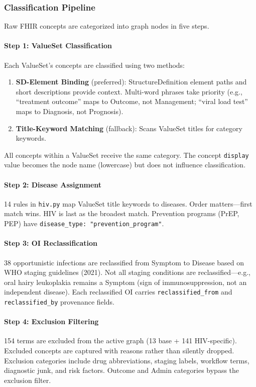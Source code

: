 \subsubsection{Classification Pipeline}

Raw FHIR concepts are categorized into graph nodes in five steps.

\paragraph{Step 1: ValueSet Classification}
Each ValueSet's concepts are classified using two methods:
\begin{enumerate}
    \item \textbf{SD-Element Binding} (preferred): StructureDefinition element paths and short descriptions provide context. Multi-word phrases take priority (e.g., ``treatment outcome'' maps to Outcome, not Management; ``viral load test'' maps to Diagnosis, not Prognosis).
    \item \textbf{Title-Keyword Matching} (fallback): Scans ValueSet titles for category keywords.
\end{enumerate}
All concepts within a ValueSet receive the same category. The concept \texttt{display} value becomes the node name (lowercase) but does not influence classification.

\paragraph{Step 2: Disease Assignment}
14 rules in \texttt{hiv.py} map ValueSet title keywords to diseases. Order matters---first match wins. HIV is last as the broadest match. Prevention programs (PrEP, PEP) have \texttt{disease\_type: "prevention\_program"}.

\paragraph{Step 3: OI Reclassification}
38 opportunistic infections are reclassified from Symptom to Disease based on WHO staging guidelines (2021). Not all staging conditions are reclassified---e.g., oral hairy leukoplakia remains a Symptom (sign of immunosuppression, not an independent disease). Each reclassified OI carries \texttt{reclassified\_from} and \texttt{reclassified\_by} provenance fields.

\paragraph{Step 4: Exclusion Filtering}
154 terms are excluded from the active graph (13 base + 141 HIV-specific). Excluded concepts are captured with reasons rather than silently dropped. Exclusion categories include drug abbreviations, staging labels, workflow terms, diagnostic junk, and risk factors. Outcome and Admin categories bypass the exclusion filter.


